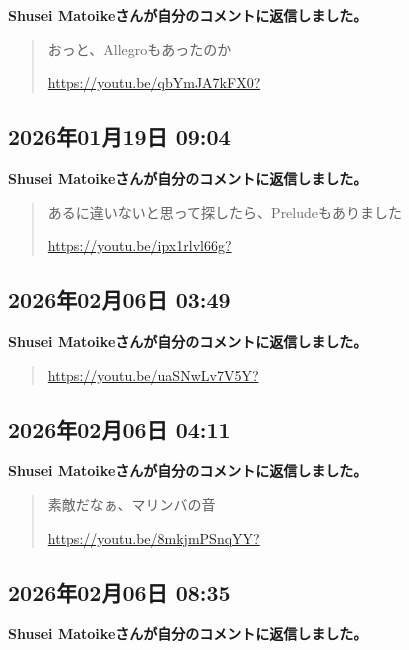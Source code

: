 \textbf{Shusei Matoikeさんが自分のコメントに返信しました。}

\begin{quote}
おっと、Allegroもあったのか

\url{https://youtu.be/qbYmJA7kFX0?}
\end{quote}

\subsection*{2026年01月19日 09:04}

\textbf{Shusei Matoikeさんが自分のコメントに返信しました。}

\begin{quote}
あるに違いないと思って探したら、Preludeもありました

\url{https://youtu.be/ipx1rlvl66g?}
\end{quote}

\subsection*{2026年02月06日 03:49}

\textbf{Shusei Matoikeさんが自分のコメントに返信しました。}

\begin{quote}
\url{https://youtu.be/uaSNwLv7V5Y?}
\end{quote}

\subsection*{2026年02月06日 04:11}

\textbf{Shusei Matoikeさんが自分のコメントに返信しました。}

\begin{quote}
素敵だなぁ、マリンバの音

\url{https://youtu.be/8mkjmPSnqYY?}
\end{quote}

\subsection*{2026年02月06日 08:35}

\textbf{Shusei Matoikeさんが自分のコメントに返信しました。}

